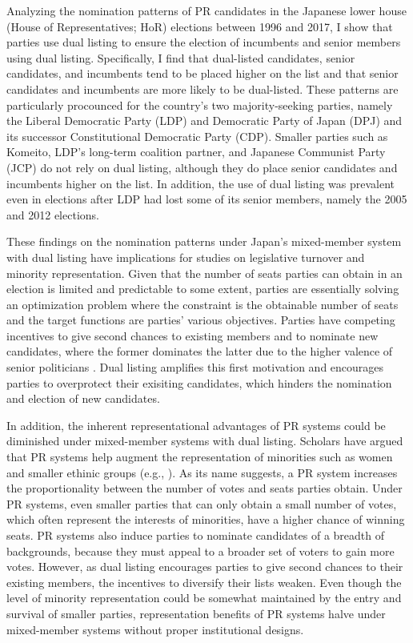 \documentclass[a4paper, 11pt]{article}
\begin{document}
Analyzing the nomination patterns of PR candidates in the Japanese lower house (House of Representatives; HoR) elections between 1996 and 2017, I show that parties use dual listing to ensure the election of incumbents and senior members using dual listing. Specifically, I find that dual-listed candidates, senior candidates, and incumbents tend to be placed higher on the list and that senior candidates and incumbents are more likely to be dual-listed. These patterns are particularly procounced for the country's two majority-seeking parties, namely the Liberal Democratic Party (LDP) and Democratic Party of Japan (DPJ) and its successor Constitutional Democratic Party (CDP). Smaller parties such as Komeito, LDP's long-term coalition partner, and Japanese Communist Party (JCP) do not rely on dual listing, although they do place senior candidates and incumbents higher on the list. In addition, the use of dual listing was prevalent even in elections after LDP had lost some of its senior members, namely the 2005 and 2012 elections. 

These findings on the nomination patterns under Japan's mixed-member system with dual listing have implications for studies on legislative turnover and minority representation. Given that the number of seats parties can obtain in an election is limited and predictable to some extent, parties are essentially solving an optimization problem where the constraint is the obtainable number of seats and the target functions are parties' various objectives. Parties have competing incentives to give second chances to existing members and to nominate new candidates, where the former dominates the latter due to the higher valence of senior politicians \citep{buisseret_party_2022}. Dual listing amplifies this first motivation and encourages parties to overprotect their exisiting candidates, which hinders the nomination and election of new candidates. 

In addition, the inherent representational advantages of PR systems could be diminished under mixed-member systems with dual listing. Scholars have argued that PR systems help augment the representation of minorities such as women and smaller ethinic groups (e.g., \citet{norris_electoral_2004}). As its name suggests, a PR system increases the proportionality between the number of votes and seats parties obtain. Under PR systems, even smaller parties that can only obtain a small number of votes, which often represent the interests of minorities, have a higher chance of winning seats. PR systems also induce parties to nominate candidates of a breadth of backgrounds, because they must appeal to a broader set of voters to gain more votes. However, as dual listing encourages parties to give second chances to their existing members, the incentives to diversify their lists weaken. Even though the level of minority representation could be somewhat maintained by the entry and survival of smaller parties, representation benefits of PR systems halve under mixed-member systems without proper institutional designs. 
\end{document}

